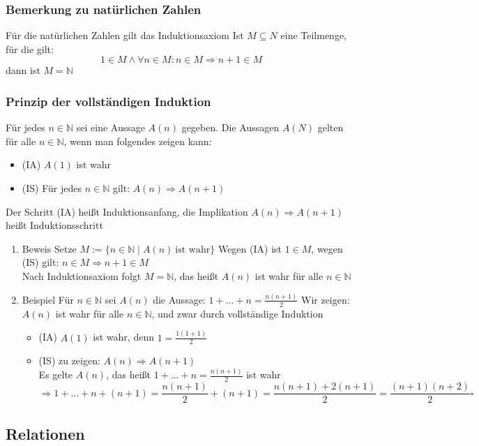 \documentclass[11pt]{article}
\DeclareMathOperator{\Forall}{\forall}
\begin{document}
\subsubsection{Bemerkung zu natürlichen Zahlen}
\label{sec-2-4-14}
Für die natürlichen Zahlen gilt das Induktionsaxiom
Ist $M\subseteq N$ eine Teilmenge, für die gilt:
\[1\in M \wedge \Forall n\in M : n\in M \Rightarrow n+1 \in M\]
dann ist $M = \mathbb{N}$
\subsubsection{Prinzip der vollständigen Induktion}
\label{sec-2-4-15}
Für jedes $n\in \mathbb{N}$ sei eine Aussage $A(n)$ gegeben. Die Aussagen $A(N)$ gelten für alle $n\in\mathbb{N}$, wenn man folgendes zeigen kann: \\
\begin{itemize}
\item (IA) $A(1)$ ist wahr
\item (IS) Für jedes $n\in\mathbb{N}$ gilt: $A(n) \Rightarrow A(n+1)$
\end{itemize}
Der Schritt (IA) heißt Induktionsanfang, die Implikation $A(n) \Rightarrow A(n+1)$ heißt Induktionsschritt
\begin{enumerate}
\item Beweis
\label{sec-2-4-15-1}
Setze $M := \{n\in \mathbb{N}\mid A(n)~\text{ist wahr}\}$
Wegen (IA) ist $1\in M$, wegen (IS) gilt: $n\in M \Rightarrow n+1 \in M$ \\
     Nach Induktionsaxiom folgt $M = \mathbb{N}$, das heißt $A(n)$ ist wahr für alle $n\in \mathbb{N}$
\item Beispiel
\label{sec-2-4-15-2}
Für $n\in\mathbb{N}$ sei $A(n)$ die Aussage: $1+\ldots + n = \frac{n(n+1)}{2}$
Wir zeigen: $A(n)$ ist wahr für alle $n\in \mathbb{N}$, und zwar durch vollständige Induktion
\begin{itemize}
\item (IA) $A(1)$ ist wahr, denn $1 = \frac{1(1+1)}{2}$
\item (IS) zu zeigen: $A(n) \Rightarrow A(n+1)$ \\
       Es gelte $A(n)$, das heißt $1+\ldots+n = \frac{n(n+1)}{2}$ ist wahr \[\Rightarrow 1 + \ldots + n + (n + 1) = \frac{n(n+1)}{2} + (n+1) =  \frac{n(n+1) + 2(n+1)}{2} = \frac{(n+1)(n+2)}{2} \square\]
\end{itemize}
\end{enumerate}
\subsection{Relationen}
\label{sec-2-5}
\end{document}
